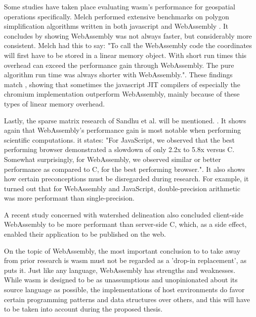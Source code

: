 Some studies have taken place evaluating \ac{wasm}'s performance for geospatial operations specifically. Melch performed extensive benchmarks on polygon simplification algorithms written in both javascript and WebAssembly \cite{melch_performance_2019}. It concludes by showing WebAssembly was not always faster, but considerably more consistent. Melch had this to say: "To call the WebAssembly code the coordinates will first have to be stored in a linear memory object. With short run times this overhead can exceed the performance gain through WebAssembly. The pure algorithm run time was always shorter with WebAssembly.". These findings match \cite{jangda_not_2019}, showing that sometimes the javascript JIT compilers of especially the chromium implementation outperform WebAssembly, mainly because of these types of linear memory overhead.

Lastly, the sparse matrix research of Sandhu et al. will be mentioned. \cite{sandhu_sparse_2018}. It shows again that WebAssembly's performance gain is most notable when performing scientific computations. it states: "For JavaScript, we observed that the best performing browser demonstrated a slowdown of only 2.2x to 5.8x versus C. Somewhat surprisingly, for WebAssembly, we observed similar or better performance as compared to C, for the best performing browser.". It also shows how certain preconceptions must be disregarded during research. For example, it turned out that for WebAssembly and JavaScript, double-precision arithmetic was more performant than single-precision.

A recent study concerned with watershed delineation \cite{sit_optimized_2019} also concluded client-side WebAssembly to be more performant than server-side C, which, as a side effect, enabled their application to be published on the web. 

On the topic of WebAssembly, the most important conclusion to to take away from prior research is \ac{wasm} must not be regarded as a 'drop-in replacement', as \cite{melch_performance_2019} puts it. Just like any language, WebAssembly has strengths and weaknesses. While \ac{wasm} is designed to be as unassumptious and unopinionated about its source language as possible, the implementations of host environments do favor certain programming patterns and data structures over others, and this will have to be taken into account during the proposed thesis.


